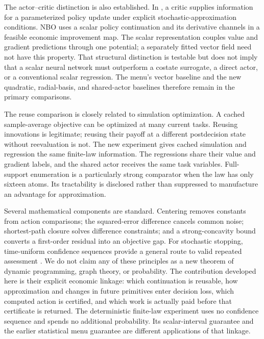 \documentclass[ecta,nameyear,draft]{econsocart}
\theoremstyle{definition}
\theoremstyle{remark}
\begin{document}
The actor--critic distinction is also established. In
\citet{konda1999}, a critic supplies information for a parameterized policy
update under explicit stochastic-approximation conditions. NBO uses a scalar
policy continuation and its derivative channels in a feasible economic
improvement map. The scalar representation couples value and gradient
predictions through one potential; a separately fitted vector field need
not have this property. That structural distinction is testable but does
not imply that a scalar neural network must outperform a costate surrogate,
a direct actor, or a conventional scalar regression. The menu's vector
baseline and the new quadratic, radial-basis, and shared-actor baselines
therefore remain in the primary comparisons.

The reuse comparison is closely related to simulation optimization. A cached
sample-average objective can be optimized at many current tasks. Reusing
innovations is legitimate; reusing their payoff at a different postdecision
state without reevaluation is not. The new experiment gives cached simulation
and regression the same finite-law information. The regressions share their
value and gradient labels, and the shared actor receives the same task
variables. Full-support enumeration is a particularly strong comparator
when the law has only sixteen atoms. Its tractability is disclosed rather
than suppressed to manufacture an advantage for approximation.

Several mathematical components are standard. Centering removes constants
from action comparisons; the squared-error difference cancels common noise;
shortest-path closure solves difference constraints; and a strong-concavity
bound converts a first-order residual into an objective gap. For stochastic
stopping, time-uniform confidence sequences provide a general route to valid
repeated assessment \citep{howard2021}. We do not claim any of these principles
as a new theorem of dynamic programming, graph theory, or probability. The
contribution developed here is their explicit economic linkage: which
continuation is reusable, how approximation and changes in future primitives
enter decision loss, which computed action is certified, and which work is
actually paid before that certificate is returned. The deterministic finite-law
experiment uses no confidence sequence and spends no additional probability.
Its scalar-interval guarantee and the earlier statistical menu guarantee
are different applications of that linkage.

\end{document}
